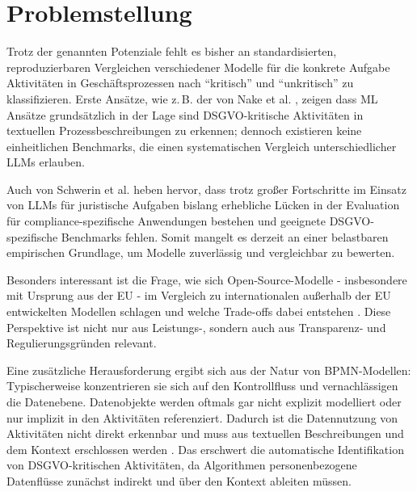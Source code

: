 \section{Problemstellung}\label{sec:problemstellung}

Trotz der genannten Potenziale fehlt es bisher an standardisierten, reproduzierbaren Vergleichen verschiedener Modelle für die konkrete Aufgabe Aktivitäten in Geschäftsprozessen nach \enquote{kritisch} und \enquote{unkritisch} zu klassifizieren. Erste Ansätze, wie z.\,B. der von Nake et al. \cite{nake2023towards}, zeigen dass ML Ansätze grundsätzlich in der Lage sind \ac{DSGVO}-kritische Aktivitäten in textuellen Prozessbeschreibungen zu erkennen; dennoch existieren keine einheitlichen Benchmarks, die einen systematischen Vergleich unterschiedlicher \acp{LLM} erlauben.

Auch von Schwerin et al. \cite{schwerin2024systematic} heben hervor, dass trotz großer Fortschritte im Einsatz von \acp{LLM} für juristische Aufgaben bislang erhebliche Lücken in der Evaluation für compliance-spezifische Anwendungen bestehen und geeignete \ac{DSGVO}-spezifische Benchmarks fehlen. Somit mangelt es derzeit an einer belastbaren empirischen Grundlage, um Modelle zuverlässig und vergleichbar zu bewerten.

Besonders interessant ist die Frage, wie sich Open-Source-Modelle - insbesondere mit Ursprung aus der \ac{EU} - im Vergleich zu internationalen außerhalb der \ac{EU} entwickelten Modellen schlagen und welche Trade-offs dabei entstehen \cite{schwerin2024systematic}. Diese Perspektive ist nicht nur aus Leistungs-, sondern auch aus Transparenz- und Regulierungsgründen relevant.

Eine zusätzliche Herausforderung ergibt sich aus der Natur von \ac{BPMN}-Modellen: Typischerweise konzentrieren sie sich auf den Kontrollfluss und vernachlässigen die Datenebene. Datenobjekte werden oftmals gar nicht explizit modelliert oder nur implizit in den Aktivitäten referenziert. Dadurch ist die Datennutzung von Aktivitäten nicht direkt erkennbar und muss aus textuellen Beschreibungen und dem Kontext erschlossen werden \cite{schneid2021uncovering}. Das erschwert die automatische Identifikation von \ac{DSGVO}-kritischen Aktivitäten, da Algorithmen personenbezogene Datenflüsse zunächst indirekt und über den Kontext ableiten müssen.